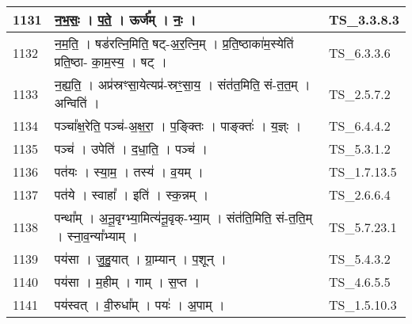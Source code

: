 \documentclass[17pt]{extarticle}
\begin{document}
\begin{longtable}{||p{0.4in}||p{4.9in}||p{0.9in}||}
    \hline
        
    1131 & न॒भ॒सः॒   ।   प॒ते॒   ।   ऊर्ज᳚म्   ।   नः॒   ।    & TS\_3.3.8.3       \\
    
    \hline
        
    1132 & न॒म॒ति॒   ।   षड॑रत्नि॒मिति॒ षट्{-}अ॒र॒त्नि॒म्   ।   प्र॒ति॒ष्ठाका॑म॒स्येति॑ प्रति॒ष्ठा{-} का॒म॒स्य॒   ।   षट्   ।    & TS\_6.3.3.6       \\
    
    \hline
        
    1133 & न॒ह्य॒ति॒   ।   अप्र॑स्रꣳसा॒येत्यप्र॑{-}स्रꣳ॒॒सा॒य॒   ।   संत॑त॒मिति॒ सं{-}त॒त॒म्   ।   अन्विति॑   ।    & TS\_2.5.7.2       \\
    
    \hline
        
    1134 & पञ्चा᳚क्ष॒रेति॒ पञ्च॑{-}अ॒क्ष॒रा॒   ।   प॒ङ्क्तिः   ।   पाङ्क्तः॑   ।   य॒ज्ञ्ः   ।    & TS\_6.4.4.2       \\
    
    \hline
        
    1135 & पञ्च॑   ।   उपेति॑   ।   द॒धा॒ति॒   ।   पञ्च॑   ।    & TS\_5.3.1.2       \\
    
    \hline
        
    1136 & पत॑यः   ।   स्या॒म॒   ।   तस्य॑   ।   व॒यम्   ।    & TS\_1.7.13.5       \\
    
    \hline
        
    1137 & पत॑ये   ।   स्वाहा᳚   ।   इति॑   ।   स्क॒न्नम्   ।    & TS\_2.6.6.4       \\
    
    \hline
        
    1138 & पन्था᳚म्   ।   अ॒नू॒वृग्भ्या॒मित्य॑नू॒वृक्{-}भ्या॒म्   ।   संत॑ति॒मिति॒ सं{-}त॒ति॒म्   ।   स्ना॒व॒न्या᳚भ्याम्   ।    & TS\_5.7.23.1       \\
    
    \hline
        
    1139 & पय॑सा   ।   जु॒हु॒यात्   ।   ग्रा॒म्यान्   ।   प॒शून्   ।    & TS\_5.4.3.2       \\
    
    \hline
        
    1140 & पय॑सा   ।   म॒हीम्   ।   गाम्   ।   स॒प्त   ।    & TS\_4.6.5.5       \\
    
    \hline
        
    1141 & पय॑स्वत्   ।   वी॒रुधा᳚म्   ।   पयः॑   ।   अ॒पाम्   ।    & TS\_1.5.10.3       \\
    

\end{longtable}
\end{document}

